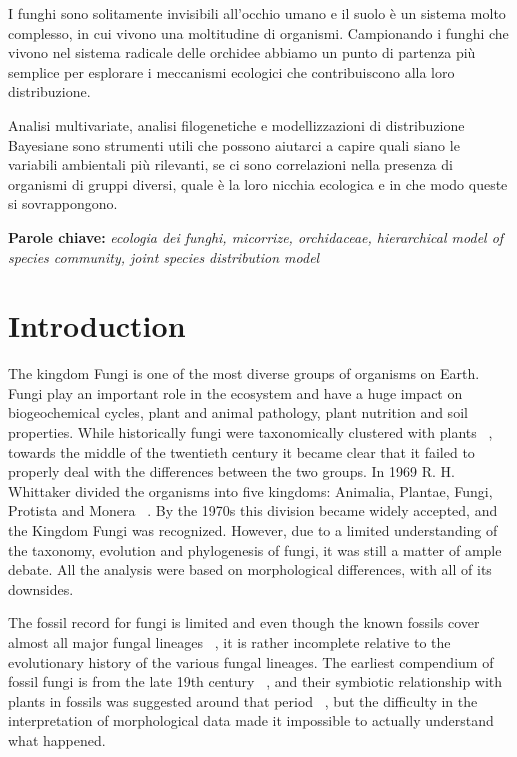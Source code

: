 I funghi sono solitamente invisibili all'occhio umano e il suolo è un sistema molto complesso, in cui vivono una moltitudine di organismi. Campionando i funghi che vivono nel sistema radicale delle orchidee abbiamo un punto di partenza più semplice per esplorare i meccanismi ecologici che contribuiscono alla loro distribuzione.

Analisi multivariate, analisi filogenetiche e modellizzazioni di distribuzione Bayesiane sono strumenti utili che possono aiutarci a capire quali siano le variabili ambientali più rilevanti, se ci sono correlazioni nella presenza di organismi di gruppi diversi, quale è la loro nicchia ecologica e in che modo queste si sovrappongono.

\textbf{Parole chiave:} \emph{ecologia dei funghi, micorrize, orchidaceae, hierarchical model of species community, joint species distribution model}

\part{Introduction}
\label{introduction}

The kingdom Fungi is one of the most diverse groups of organisms on Earth. Fungi play an important role in the ecosystem and have a huge impact on biogeochemical cycles, plant and animal pathology, plant nutrition and soil properties.
While historically fungi were taxonomically clustered with plants ~\citep{copeland1938, copeland1956}, towards the middle of the twentieth century it became clear that it failed to properly deal with the differences between the two groups. In 1969 R. H. Whittaker divided the organisms into five kingdoms: Animalia, Plantae, Fungi, Protista and Monera ~\citep{whittaker1969}. By the 1970s this division became widely accepted, and the Kingdom Fungi was recognized.
However, due to a limited understanding of the taxonomy, evolution and phylogenesis of fungi, it was still a matter of ample debate. All the analysis were based on morphological differences, with all of its downsides.

The fossil record for fungi is limited and even though the known fossils cover almost all major fungal lineages ~\citep{lucking2009}, it is rather incomplete relative to the evolutionary history of the various fungal lineages. The earliest compendium of fossil fungi is from the late 19th century ~\citep{meschinelli1898}, and their symbiotic relationship with plants in fossils was suggested around that period ~\citep{renault1896}, but the difficulty in the interpretation of morphological data made it impossible to actually understand what happened.

